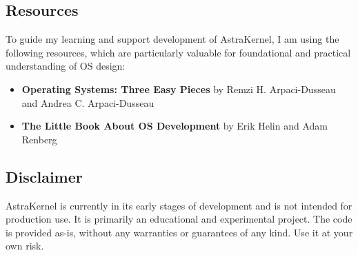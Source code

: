 \subsection*{Resources}

To guide my learning and support development of AstraKernel, I am using the following resources, 
which are particularly valuable for foundational and practical understanding of OS design:
\begin{itemize}
  \item \textbf{Operating Systems: Three Easy Pieces} by Remzi H. Arpaci-Dusseau and Andrea C. Arpaci-Dusseau
  \item \textbf{The Little Book About OS Development} by Erik Helin and Adam Renberg
\end{itemize}

\subsection*{Disclaimer}
AstraKernel is currently in its early stages of development and is not intended for production use. 
It is primarily an educational and experimental project. The code is provided as-is, 
without any warranties or guarantees of any kind. Use it at your own risk.
